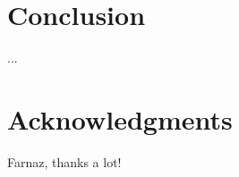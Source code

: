 \documentclass{sigchi}
\begin{document}
\section{Conclusion}
...

\section{Acknowledgments}
Farnaz, thanks a lot!

%
%
%
%
%
\balance



\end{document}
